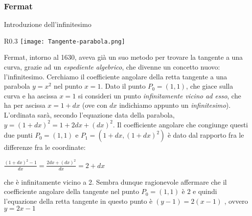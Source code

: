 \begin{frame}[label=Fermat]
    \frametitle{Fermat}
    \begin{block}{Introduzione dell'infinitesimo}
        \begin{wrapfigure}{R}{0.3\textwidth}
            \centering
            \texttt{[image: Tangente-parabola.png]}
        \end{wrapfigure}

        Fermat, intorno al 1630, aveva già un suo metodo per trovare la tangente a una curva, 
        grazie ad un \textit{espediente algebrico}, 
        che divenne un concetto nuovo: \alert{l'infinitesimo}.
        \pause
        Cerchiamo il coefficiente angolare della retta tangente a una parabola
        $y = x^2$ nel punto $x=1$. Dato il punto $P_0=(1,1)$, che giace sulla curva 
        e ha ascissa $x=1$ si consideri 
        un punto \textit{infinitamente vicino ad esso}, che ha per ascissa $x=1+dx$
        (ove con $dx$ indichiamo appunto un \textit{infinitesimo}).
        L'ordinata sarà, secondo l'equazione data della parabola,
        $y= {(1+dx)}^2 = {1 + 2dx + {(dx)}^2}$.
        Il coefficiente angolare che congiunge questi due punti $P_0=(1,1)$ e 
        $P_1=(1+dx,{(1+dx)}^2)$ è dato dal rapporto fra le differenze fra le coordinate:
        \begin{center}
            $\frac{{(1+dx)}^2-1}{dx} = \frac{2dx+{(dx)}^2}{dx} = 2 + dx$
        \end{center}
        che è infinitamente vicino a 2. Sembra dunque ragionevole affermare che 
        il coefficiente angolare della tangente nel punto $P_0=(1,1)$ è $2$ e quindi 
        l'equazione della retta tangente in questo punto è
            $(y-1) = 2(x-1)$ , ovvero $y = 2x -1$
    \end{block}
\end{frame}